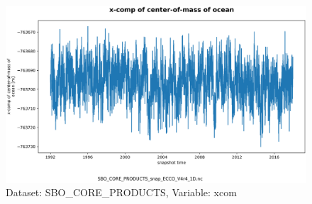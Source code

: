 \begin{figure}[H]
\centering
\includegraphics[scale=0.55]{../images/plots/v4r4/oneD_plots/SBO_Core_Products/xcom.png}
\caption{Dataset: SBO\_CORE\_PRODUCTS, Variable: xcom}
\label{tab:table-SBO_CORE_PRODUCTS_xcom-Plot}
\end{figure}
\newpage
\pagebreak
